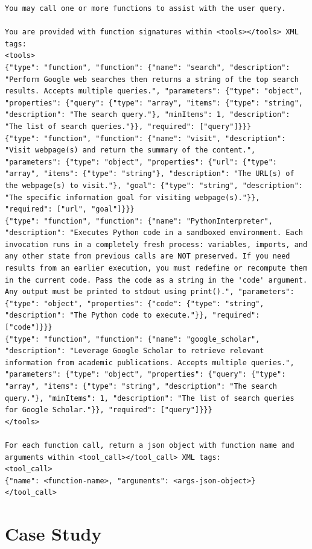 \documentclass[table]{gtech}
\begin{document}
\begin{lstlisting}
You may call one or more functions to assist with the user query.

You are provided with function signatures within <tools></tools> XML tags:
<tools>
{"type": "function", "function": {"name": "search", "description": "Perform Google web searches then returns a string of the top search results. Accepts multiple queries.", "parameters": {"type": "object", "properties": {"query": {"type": "array", "items": {"type": "string", "description": "The search query."}, "minItems": 1, "description": "The list of search queries."}}, "required": ["query"]}}}
{"type": "function", "function": {"name": "visit", "description": "Visit webpage(s) and return the summary of the content.", "parameters": {"type": "object", "properties": {"url": {"type": "array", "items": {"type": "string"}, "description": "The URL(s) of the webpage(s) to visit."}, "goal": {"type": "string", "description": "The specific information goal for visiting webpage(s)."}}, "required": ["url", "goal"]}}}
{"type": "function", "function": {"name": "PythonInterpreter", "description": "Executes Python code in a sandboxed environment. Each invocation runs in a completely fresh process: variables, imports, and any other state from previous calls are NOT preserved. If you need results from an earlier execution, you must redefine or recompute them in the current code. Pass the code as a string in the 'code' argument. Any output must be printed to stdout using print().", "parameters": {"type": "object", "properties": {"code": {"type": "string", "description": "The Python code to execute."}}, "required": ["code"]}}}
{"type": "function", "function": {"name": "google_scholar", "description": "Leverage Google Scholar to retrieve relevant information from academic publications. Accepts multiple queries.", "parameters": {"type": "object", "properties": {"query": {"type": "array", "items": {"type": "string", "description": "The search query."}, "minItems": 1, "description": "The list of search queries for Google Scholar."}}, "required": ["query"]}}}
</tools>

For each function call, return a json object with function name and arguments within <tool_call></tool_call> XML tags:
<tool_call>
{"name": <function-name>, "arguments": <args-json-object>}
</tool_call>
\end{lstlisting}


\clearpage
\section{Case Study}
\label{sec:appendix-case}
\end{document}
